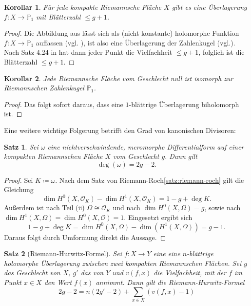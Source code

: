 \documentclass[11pt,a4paper,toc=bibliography]{scrartcl}
\theoremstyle{thm}
\newtheorem{satz}{Satz}[section]
\newtheorem{koro}{Korollar}[section]
\theoremstyle{def}
\theoremstyle{remark}
\begin{document}
\begin{koro}
	Für jede kompakte Riemannsche Fläche $X$ gibt es eine Überlagerung $f:X\rightarrow \mathbb{P}_1$ mit Blätterzahl $\leq g+1$.
	\end{koro}
\begin{proof}
	Die Abbildung aus  lässt sich als (nicht konstante) holomorphe Funktion $f:X\rightarrow \mathbb{P}_1$ auffassen (vgl. \cite[~S.8]{forster}), ist also eine Überlagerung der Zahlenkugel (vgl.\cite[S.18, Satz 4.2]{forster}). Nach Satz 4.24 in \cite{forster} hat dann jeder Punkt die Vielfachheit $\leq g+1$, folglich ist die Blätterzahl $\leq g+1$.
	
\end{proof}
\begin{koro}
	Jede Riemannsche Fläche vom Geschlecht null ist isomorph zur Riemannschen Zahlenkugel $\mathbb{P}_1$.
\end{koro}
\begin{proof}
Das folgt sofort daraus, dass eine $1$-blättrige Überlagerung biholomorph ist.
\end{proof}
Eine weitere wichtige Folgerung betrifft den Grad von kanonischen Divisoren:
\begin{satz}
	Sei $\omega$ eine nichtverschwindende, meromorphe Differentialform auf einer kompakten Riemannschen Fläche $X$ vom Geschlecht $g$. Dann gilt 
	\[\deg (\omega) = 2g-2.
	\]
\end{satz}
\begin{proof}
		Sei $K\coloneqq \omega.$ Nach dem Satz von Riemann-Roch\ref{satz:riemann-roch} gilt die Gleichung
		\[
		\dim H^0(X,\mathcal{O}_K)-\dim H^1(X,\mathcal{O}_K)=1-g+\deg K.
		\]
		Außerdem ist nach  Teil (ii) $\Omega\cong\mathcal{O}_K$ und nach \cite[17.10]{forster} $\dim H^0(X,\Omega)=g$, sowie nach \cite[17.11]{forster} $\dim H^1(X,\Omega)=\dim H^0(X,\mathcal{O})=1$. Eingesetzt ergibt sich
		\[
		1-g+\deg K = \dim H^0(X,\Omega)-\dim(H^1(X,\Omega))=g-1.
		\]
		Daraus folgt durch Umformung direkt die Aussage.
\end{proof}
\begin{satz}[Riemann-Hurwitz-Formel]
	Sei $f:X\rightarrow Y$ eine eine $n$-blättrige holomorphe Überlagerung zwischen zwei kompakten Riemannschen Flächen. Sei $g$ das Geschlecht von $X$, $g'$ das von $Y$ und $v(f,x)$ die Vielfachheit, mit der $f$ im Punkt $x\in X$ den Wert $f(x)$ annimmt. Dann gilt die Riemann-Hurwitz-Formel
	\[
	2g-2=n(2g'-2)+\sum_{x\in X}\left(v(f,x)-1\right)
	\]
\end{satz}
\end{document}
